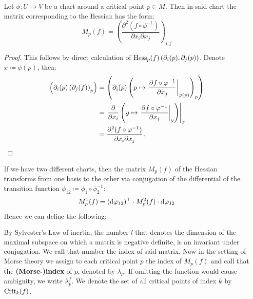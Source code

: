  \begin{corollary}\label{cor:morse-localHessian}
 	Let $\phi:U\to V$ be a  chart around a critical point $p\in M$. Then in said chart the matrix corresponding to the Hessian has the form:
 	\begin{equation*}
 		M_p(f)=\left(\frac{\partial^2 (f\circ \phi^{-1})}{\partial x_i\partial x_j}\right)_{i,j}
 	\end{equation*}
 \end{corollary}
 \begin{proof}
 	This follows by direct calculation of $\operatorname{\mathrm{Hess}}_p(f)\left(\partial_i(p),\partial_j(p)\right)$. Denote $x\coloneq \phi(p)$, then:
 	\begin{align*}
 		\left(\partial_i(p)\left(\partial_j(f)\right)_p\right)
 		&=\left(\partial_i(p)
 			\left(
 				p\mapsto \left.\frac{\partial f\circ \varphi^{-1}}{\partial  x_j}\right|_{\varphi(p)}\right)_p
 			\right)\\
 		&=\left.
 			\frac{\partial}{\partial x_i}
 				\left(
 				y \mapsto \left.\frac{\partial f\circ \varphi^{-1}}{\partial  x_j}\right|_{y}
 				\right)
 			\right|_{x}\\
 		&=\frac{\partial^2 (f\circ \varphi^{-1})}{\partial x_i\partial x_j}\,.
 	\end{align*}
 \end{proof}
\begin{remark}
	 If we have two different charts, then the matrix $M_p(f)$ of the Hessian transforms from one basis to the other via conjugation of the differential of the transition function $\phi_{12}\coloneq \phi_1 \circ \phi_2^{-1}$:
	\begin{equation*}
		M_p^1(f)=(\mathop{}\!\mathrm{d} \varphi_{12})^\top  \cdot   M_p^2(f)   \cdot   \mathop{}\!\mathrm{d} \varphi_{12}
	\end{equation*} Hence we can define the following:
\end{remark}

\begin{definition}\label{def:morse-morseIndex}
	By Sylvester's Law of inertia, the number $l$ that denotes the dimension of the maximal subspace on which a matrix is negative definite, is an invariant under conjugation. We call that number the index of said matrix. Now in the setting of Morse theory we assign to each critical point $p$ the index of $M_p(f)$ and call that the \textbf{(Morse-)index} of $p$, denoted by $\lambda_p$. If omitting the function would cause ambiguity, we write $\lambda^f_p$. We denote the set of all critical points of index $k$ by $\mathrm{Crit}_k(f)$.
\end{definition}

